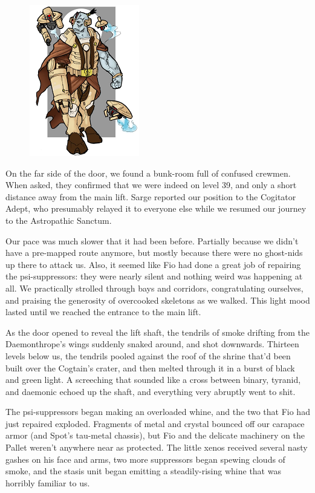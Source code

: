 \begin{figure}
	\begin{center}
		\includegraphics[width=\figwidth]{pics/15/63.png}
	\end{center}
\end{figure}
On  the far side of the door, we found a bunk-room full of confused crewmen. 
When asked, they confirmed that we were indeed on level 39, and only a short distance away from the main lift. 
Sarge reported our position to the Cogitator Adept, who presumably relayed it to everyone else while we resumed our journey to the Astropathic Sanctum.

Our pace was much slower that it had been before. 
Partially because we didn't have a pre-mapped route anymore, but mostly because there were no ghost-nids up there to attack us. 
Also, it seemed like Fio had done a great job of repairing the psi-suppressors: 
they were nearly silent and nothing weird was happening at all. 
We practically strolled through bays and corridors, congratulating ourselves, and praising the generosity of overcooked skeletons as we walked. 
This light mood lasted until we reached the entrance to the main lift. 


As the door opened to reveal the lift shaft, the tendrils of smoke drifting from the Daemonthrope's wings suddenly snaked around, and shot downwards. 
Thirteen levels below us, the tendrils pooled against the roof of the shrine that'd been built over the Cogtain's crater, and then melted through it in a burst of black and green light. 
A screeching that sounded like a cross between binary, tyranid, and daemonic echoed up the shaft, and everything very abruptly went to shit. 


The psi-suppressors began making an overloaded whine, and the two that Fio had just repaired exploded. 
Fragments of metal and crystal bounced off our carapace armor (and Spot's tau-metal chassis), but Fio and the delicate machinery on the Pallet weren't anywhere near as protected. 
The little xenos received several nasty gashes on his face and arms, two more suppressors began spewing clouds of smoke, and the stasis unit began emitting a steadily-rising whine that was horribly familiar to us.


